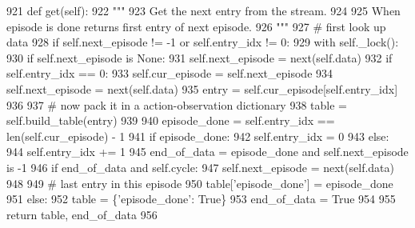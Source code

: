 \begin{DoxyCode}
921     \textcolor{keyword}{def }get(self):
922         \textcolor{stringliteral}{"""}
923 \textcolor{stringliteral}{        Get the next entry from the stream.}
924 \textcolor{stringliteral}{}
925 \textcolor{stringliteral}{        When episode is done returns first entry of next episode.}
926 \textcolor{stringliteral}{        """}
927         \textcolor{comment}{# first look up data}
928         \textcolor{keywordflow}{if} self.next\_episode != -1 \textcolor{keywordflow}{or} self.entry\_idx != 0:
929             with self.\_lock():
930                 \textcolor{keywordflow}{if} self.next\_episode \textcolor{keywordflow}{is} \textcolor{keywordtype}{None}:
931                     self.next\_episode = next(self.data)
932                 \textcolor{keywordflow}{if} self.entry\_idx == 0:
933                     self.cur\_episode = self.next\_episode
934                     self.next\_episode = next(self.data)
935                 entry = self.cur\_episode[self.entry\_idx]
936 
937                 \textcolor{comment}{# now pack it in a action-observation dictionary}
938                 table = self.build\_table(entry)
939 
940                 episode\_done = self.entry\_idx == len(self.cur\_episode) - 1
941                 \textcolor{keywordflow}{if} episode\_done:
942                     self.entry\_idx = 0
943                 \textcolor{keywordflow}{else}:
944                     self.entry\_idx += 1
945                 end\_of\_data = episode\_done \textcolor{keywordflow}{and} self.next\_episode \textcolor{keywordflow}{is} -1
946                 \textcolor{keywordflow}{if} end\_of\_data \textcolor{keywordflow}{and} self.cycle:
947                     self.next\_episode = next(self.data)
948 
949                 \textcolor{comment}{# last entry in this episode}
950                 table[\textcolor{stringliteral}{'episode\_done'}] = episode\_done
951         \textcolor{keywordflow}{else}:
952             table = \{\textcolor{stringliteral}{'episode\_done'}: \textcolor{keyword}{True}\}
953             end\_of\_data = \textcolor{keyword}{True}
954 
955         \textcolor{keywordflow}{return} table, end\_of\_data
956 
\end{DoxyCode}
\mbox{\label{classparlai_1_1core_1_1teachers_1_1StreamDialogData_a5f3e6484038cefcc177a635148f0b492}} 

